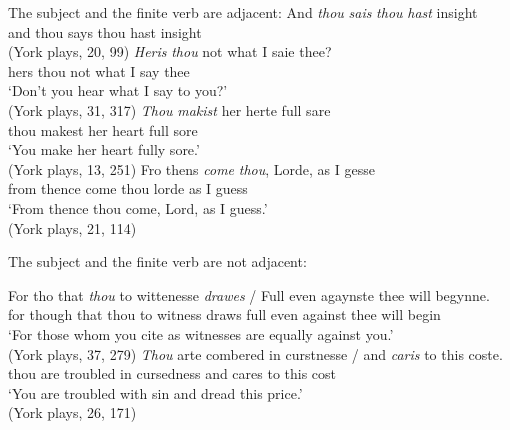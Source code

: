\documentclass[output=paper]{langsci/langscibook}
\begin{document}
The subject and the finite verb are adjacent:
\ea \label{ex:10:12}
\ea \gll And \textit{thou} \textit{sais} \textit{thou} \textit{hast} insight\\
and thou says thou hast insight\\
\glt (York plays, 20, 99)
\ex \gll \textit{Heris} \textit{thou} not what I saie thee?\\
hers thou not what I say thee\\
\glt ‘Don't you hear what I say to you?'\\
(York plays, 31, 317)
\ex \gll \textit{Thou} \textit{makist} her herte full sare\\
thou makest her heart full sore\\
\glt ‘You make her heart fully sore.'\\
(York plays, 13, 251)
\ex \gll Fro thens \textit{come} \textit{thou}, Lorde, as I gesse\\
from thence come thou lorde as I guess\\
\glt ‘From thence thou come, Lord, as I guess.'\\
(York plays, 21, 114)
\z
\z

The subject and the finite verb are not adjacent:

\ea \label{ex:10:13}
\ea \gll For tho that \textit{thou} to wittenesse \textit{drawes} / Full even agaynste thee will begynne.\\
for though that thou to witness draws {} full even against thee will begin\\
\glt `For those whom you cite as witnesses are equally against you.'\\
\glt (York plays, 37, 279)
\ex \gll \textit{Thou} arte combered in curstnesse / and \textit{caris} to this coste.\\
thou are troubled in cursedness {} and cares to this cost\\
\glt `You are troubled with sin and dread this price.'\\
\glt (York plays, 26, 171)
\z
\z
\end{document}

